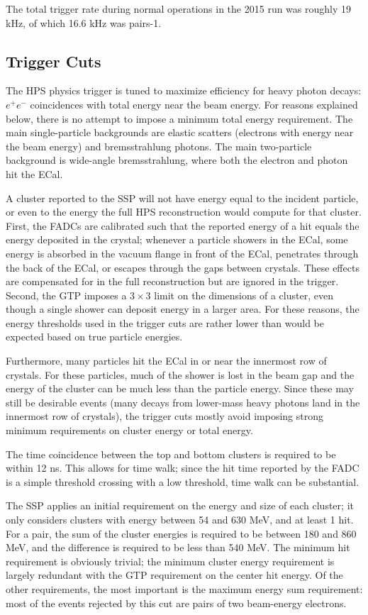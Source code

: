 The total trigger rate during normal operations in the 2015 run was roughly 19 kHz, of which 16.6 kHz was pairs-1.

\subsection{Trigger Cuts}
\label{sec:trigger_cuts}

The HPS physics trigger is tuned to maximize efficiency for heavy photon decays: $e^+e^-$ coincidences with total energy near the beam energy.
For reasons explained below, there is no attempt to impose a minimum total energy requirement.
The main single-particle backgrounds are elastic scatters (electrons with energy near the beam energy) and bremsstrahlung photons.
The main two-particle background is wide-angle bremsstrahlung, where both the electron and photon hit the ECal.

A cluster reported to the SSP will not have energy equal to the incident particle, or even to the energy the full HPS reconstruction would compute for that cluster.
First, the FADCs are calibrated such that the reported energy of a hit equals the energy deposited in the crystal; whenever a particle showers in the ECal, some energy is absorbed in the vacuum flange in front of the ECal, penetrates through the back of the ECal, or escapes through the gaps between crystals.
These effects are compensated for in the full reconstruction but are ignored in the trigger.
Second, the GTP imposes a $3\times 3$ limit on the dimensions of a cluster, even though a single shower can deposit energy in a larger area.
For these reasons, the energy thresholds used in the trigger cuts are rather lower than would be expected based on true particle energies.

Furthermore, many particles hit the ECal in or near the innermost row of crystals.
For these particles, much of the shower is lost in the beam gap and the energy of the cluster can be much less than the particle energy.
Since these may still be desirable events (many decays from lower-mass heavy photons land in the innermost row of crystals), the trigger cuts mostly avoid imposing strong minimum requirements on cluster energy or total energy.

The time coincidence between the top and bottom clusters is required to be within 12 ns.
This allows for time walk; since the hit time reported by the FADC is a simple threshold crossing with a low threshold, time walk can be substantial.

The SSP applies an initial requirement on the energy and size of each cluster; it only considers clusters with energy between 54 and 630 MeV, and at least 1 hit.
For a pair, the sum of the cluster energies is required to be between 180 and 860 MeV, and the difference is required to be less than 540 MeV.
The minimum hit requirement is obviously trivial; the minimum cluster energy requirement is largely redundant with the GTP requirement on the center hit energy.
Of the other requirements, the most important is the maximum energy sum requirement: most of the events rejected by this cut are pairs of two beam-energy electrons.

